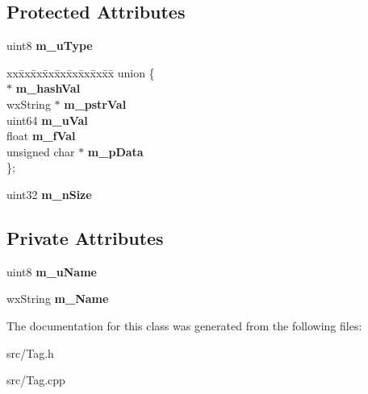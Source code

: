 \subsection*{Protected Attributes}
\begin{DoxyCompactItemize}
\item 
uint8 {\bfseries m\_\-uType}\label{classCTag_a0c1ea7eeb38f2d23196b4b21ad2bb5de}

\item 
\begin{tabbing}
xx\=xx\=xx\=xx\=xx\=xx\=xx\=xx\=xx\=\kill
union \{\\
 $\ast$ {\bfseries m\_hashVal}\\
\>wxString $\ast$ {\bfseries m\_pstrVal}\\
\>uint64 {\bfseries m\_uVal}\\
\>float {\bfseries m\_fVal}\\
\>unsigned char $\ast$ {\bfseries m\_pData}\\
\}; \label{classCTag_ab8929e3b188e215b11d883b1c6c5d99f}
\\

\end{tabbing}\item 
uint32 {\bfseries m\_\-nSize}\label{classCTag_a7e2472a8253212c956d8f8473a80d6f9}

\end{DoxyCompactItemize}
\subsection*{Private Attributes}
\begin{DoxyCompactItemize}
\item 
uint8 {\bfseries m\_\-uName}\label{classCTag_a36cd53c12a6f10dcadda731c94f4592e}

\item 
wxString {\bfseries m\_\-Name}\label{classCTag_a5f22ebd46151a6d1a863beb70d5e0c91}

\end{DoxyCompactItemize}


The documentation for this class was generated from the following files:\begin{DoxyCompactItemize}
\item 
src/Tag.h\item 
src/Tag.cpp\end{DoxyCompactItemize}
